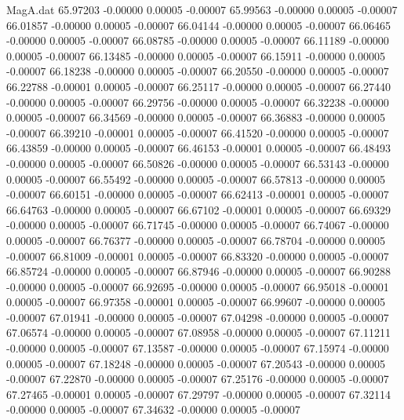 \begin{filecontents}{MagA.dat}
  65.97203   -0.00000    0.00005   -0.00007
  65.99563   -0.00000    0.00005   -0.00007
  66.01857   -0.00000    0.00005   -0.00007
  66.04144   -0.00000    0.00005   -0.00007
  66.06465   -0.00000    0.00005   -0.00007
  66.08785   -0.00000    0.00005   -0.00007
  66.11189   -0.00000    0.00005   -0.00007
  66.13485   -0.00000    0.00005   -0.00007
  66.15911   -0.00000    0.00005   -0.00007
  66.18238   -0.00000    0.00005   -0.00007
  66.20550   -0.00000    0.00005   -0.00007
  66.22788   -0.00001    0.00005   -0.00007
  66.25117   -0.00000    0.00005   -0.00007
  66.27440   -0.00000    0.00005   -0.00007
  66.29756   -0.00000    0.00005   -0.00007
  66.32238   -0.00000    0.00005   -0.00007
  66.34569   -0.00000    0.00005   -0.00007
  66.36883   -0.00000    0.00005   -0.00007
  66.39210   -0.00001    0.00005   -0.00007
  66.41520   -0.00000    0.00005   -0.00007
  66.43859   -0.00000    0.00005   -0.00007
  66.46153   -0.00001    0.00005   -0.00007
  66.48493   -0.00000    0.00005   -0.00007
  66.50826   -0.00000    0.00005   -0.00007
  66.53143   -0.00000    0.00005   -0.00007
  66.55492   -0.00000    0.00005   -0.00007
  66.57813   -0.00000    0.00005   -0.00007
  66.60151   -0.00000    0.00005   -0.00007
  66.62413   -0.00001    0.00005   -0.00007
  66.64763   -0.00000    0.00005   -0.00007
  66.67102   -0.00001    0.00005   -0.00007
  66.69329   -0.00000    0.00005   -0.00007
  66.71745   -0.00000    0.00005   -0.00007
  66.74067   -0.00000    0.00005   -0.00007
  66.76377   -0.00000    0.00005   -0.00007
  66.78704   -0.00000    0.00005   -0.00007
  66.81009   -0.00001    0.00005   -0.00007
  66.83320   -0.00000    0.00005   -0.00007
  66.85724   -0.00000    0.00005   -0.00007
  66.87946   -0.00000    0.00005   -0.00007
  66.90288   -0.00000    0.00005   -0.00007
  66.92695   -0.00000    0.00005   -0.00007
  66.95018   -0.00001    0.00005   -0.00007
  66.97358   -0.00001    0.00005   -0.00007
  66.99607   -0.00000    0.00005   -0.00007
  67.01941   -0.00000    0.00005   -0.00007
  67.04298   -0.00000    0.00005   -0.00007
  67.06574   -0.00000    0.00005   -0.00007
  67.08958   -0.00000    0.00005   -0.00007
  67.11211   -0.00000    0.00005   -0.00007
  67.13587   -0.00000    0.00005   -0.00007
  67.15974   -0.00000    0.00005   -0.00007
  67.18248   -0.00000    0.00005   -0.00007
  67.20543   -0.00000    0.00005   -0.00007
  67.22870   -0.00000    0.00005   -0.00007
  67.25176   -0.00000    0.00005   -0.00007
  67.27465   -0.00001    0.00005   -0.00007
  67.29797   -0.00000    0.00005   -0.00007
  67.32114   -0.00000    0.00005   -0.00007
  67.34632   -0.00000    0.00005   -0.00007

\end{filecontents}
